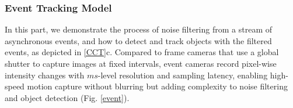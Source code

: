 
\subsubsection{\textbf{Event Tracking Model}} \label{4.1.2}
In this part, we demonstrate the process of noise filtering from a stream of asynchronous events, and how to detect and track objects with the filtered events, as depicted in \fig \ref{CCT}c.
Compared to frame cameras that use a global shutter to capture images at fixed intervals, event cameras record pixel-wise intensity changes with $ms$-level resolution and sampling latency, enabling high-speed motion capture without blurring but adding complexity to noise filtering and object detection (Fig. \ref{event}).


